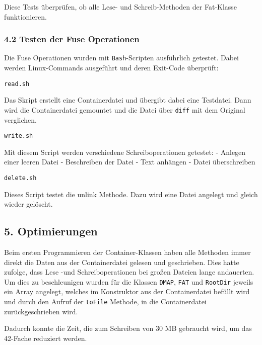 \documentclass[]{article}
\newenvironment{Shaded}{}{}
\newcommand{\BuiltInTok}[1]{#1}
\newcommand{\KeywordTok}[1]{\textcolor[rgb]{0.00,0.44,0.13}{\textbf{#1}}}
\newcommand{\NormalTok}[1]{#1}
\newcommand{\OperatorTok}[1]{\textcolor[rgb]{0.40,0.40,0.40}{#1}}
\newcommand{\OtherTok}[1]{\textcolor[rgb]{0.00,0.44,0.13}{#1}}
\newcommand{\StringTok}[1]{\textcolor[rgb]{0.25,0.44,0.63}{#1}}
\newcommand{\VariableTok}[1]{\textcolor[rgb]{0.10,0.09,0.49}{#1}}
\begin{document}
Diese Tests überprüfen, ob alle Lese- und Schreib-Methoden der Fat-Klasse
funktionieren.

\hypertarget{testen-der-fuse-operationen}{%
\subsubsection{4.2 Testen der Fuse
Operationen}\label{testen-der-fuse-operationen}}

Die Fuse Operationen wurden mit \texttt{Bash}-Scripten ausführlich
getestet. Dabei werden Linux-Commands ausgeführt und deren Exit-Code überprüft:

\begin{Shaded}
\begin{framed}
\end{framed}
\end{Shaded}

\texttt{read.sh}

Das Skript erstellt eine Containerdatei und übergibt dabei eine
Testdatei. Dann wird die Containerdatei gemountet und die Datei über
\texttt{diff} mit dem Original verglichen.

\texttt{write.sh}

Mit diesem Script werden verschiedene Schreiboperationen getestet: -
Anlegen einer leeren Datei - Beschreiben der Datei - Text anhängen -
Datei überschreiben

\texttt{delete.sh}

Dieses Script testet die unlink Methode. Dazu wird eine Datei angelegt
und gleich wieder gelöscht.

\hypertarget{optimierungen}{%
\subsection{5. Optimierungen}\label{optimierungen}}

Beim ersten Programmieren der Container-Klassen haben alle Methoden
immer direkt die Daten aus der Containerdatei gelesen und geschrieben.
Dies hatte zufolge, dass Lese -und Schreiboperationen bei großen Dateien
lange andauerten. Um dies zu beschleunigen wurden für die Klassen
\texttt{DMAP}, \texttt{FAT} und \texttt{RootDir} jeweils ein Array
angelegt, welches im Konstruktor aus der Containerdatei befüllt wird und
durch den Aufruf der \texttt{toFile} Methode, in die Containerdatei
zurückgeschrieben wird.

Dadurch konnte die Zeit, die zum Schreiben von 30 MB gebraucht wird, um
das 42-Fache reduziert werden.
\end{document}
